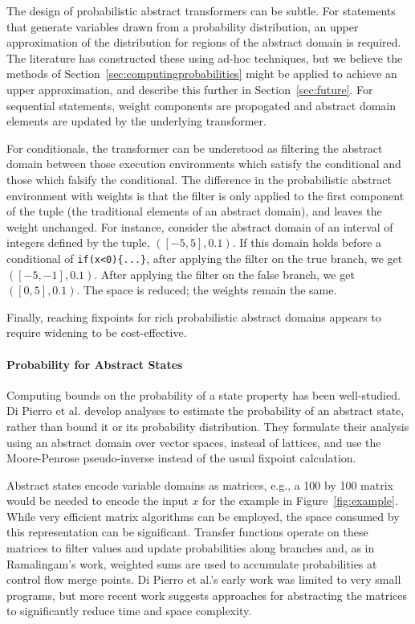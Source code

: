 The design of probabilistic abstract transformers can be subtle.
For statements that generate variables drawn from a probability
distribution, an upper approximation of the distribution for
regions of the abstract domain is required.  The literature
has constructed these using ad-hoc techniques, but we believe
the methods of Section~\ref{sec:computingprobabilities} might be applied to 
achieve an upper approximation, and describe this further in Section~\ref{sec:future}.
For sequential statements, weight components are propogated
and abstract domain elements are updated by the underlying transformer.

For conditionals, the transformer can be understood
as filtering the abstract domain between those execution environments which
satisfy the conditional and those which falsify the conditional. 
The difference in the probabilistic abstract environment with weights 
is that the filter is only applied to the first component of
the tuple (the traditional elements of an abstract domain), 
and leaves the weight unchanged.
For instance, consider the abstract domain of an interval of 
integers defined by the tuple, $([-5,5],0.1)$. 
If this domain holds before a conditional of 
{\tt if(x<0)\{...\}}, after applying the filter on the true branch, 
we get $([-5,-1],0.1)$. 
After applying the filter on the false branch, we get $([0,5],0.1)$.
The space is reduced; the weights remain the same.

Finally, reaching fixpoints for rich probabilistic abstract domains
appears to require widening \cite{monniaux2000abstract,esparza2011probabilistic} to be cost-effective.

\paragraph{Probability for Abstract States}

Computing bounds on the probability of a state property has been well-studied.
Di Pierro et al. \cite{di2013probabilistic} develop analyses
to estimate the probability of an abstract state, 
rather than bound it or its probability distribution.  
They formulate their analysis using an abstract 
domain over vector spaces, instead of lattices, and use
the Moore-Penrose pseudo-inverse instead of the usual fixpoint calculation.

Abstract states encode variable domains as matrices, e.g., a 100 by 100 matrix
would be needed to encode the input $x$ for the example in 
Figure~\ref{fig:example}.  While very efficient matrix algorithms
can be employed, the space consumed by this representation can
be significant.  
Transfer functions operate on these matrices to filter values and
update probabilities along branches and, 
as in Ramalingam's work, weighted sums are used to accumulate probabilities
at control flow merge points.
Di Pierro et al.'s early work was limited to very small 
programs, but more recent
work suggests approaches for abstracting the matrices to significantly
reduce time and space complexity.   

